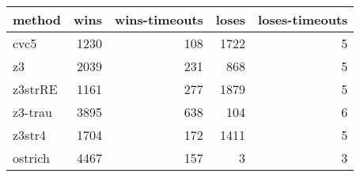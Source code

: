 \begin{tabular}{lrrrr}
\hline
 method   &   wins &   wins-timeouts &   loses &   loses-timeouts \\
\hline
 cvc5     &   1230 &             108 &    1722 &                5 \\
 z3       &   2039 &             231 &     868 &                5 \\
 z3strRE  &   1161 &             277 &    1879 &                5 \\
 z3-trau  &   3895 &             638 &     104 &                6 \\
 z3str4   &   1704 &             172 &    1411 &                5 \\
 ostrich  &   4467 &             157 &       3 &                3 \\
\hline
\end{tabular}
